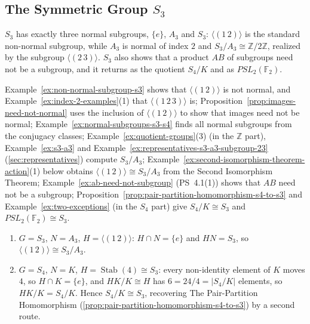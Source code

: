 \documentclass[11pt]{report}
\begin{document}
\subsection{\texorpdfstring{The Symmetric Group $S_3$}{The Symmetric Group S₃}}\label{sec:rev-ch8-s3}

$S_3$ has exactly three normal subgroups, $\{e\}$, $A_3$ and $S_3$: $\langle (1\,2) \rangle$ is the standard non-normal subgroup, while $A_3$ is normal of index $2$ and $S_3/A_3 \cong \mathbb{Z}/2\mathbb{Z}$, realized by the subgroup $\langle (2\,3) \rangle$. $S_3$ also shows that a product $AB$ of subgroups need not be a subgroup, and it returns as the quotient $S_4/K$ and as $PSL_2(\mathbb{F}_2)$.

Example~\ref{ex:non-normal-subgroup-s3} shows that $\langle (1\,2) \rangle$ is not normal, and Example~\ref{ex:index-2-examples}(1) that $\langle (1\,2\,3) \rangle$ is; Proposition~\ref{prop:images-need-not-normal} uses the inclusion of $\langle (1\,2) \rangle$ to show that images need not be normal; Example~\ref{ex:normal-subgroups-s3-s4} finds all normal subgroups from the conjugacy classes; Example~\ref{ex:quotient-groups}(3) (in the $\mathbb{Z}$ part), Example~\ref{ex:s3-a3} and Example~\ref{ex:representatives-s3-a3-subgroup-23} (\ref{sec:representatives}) compute $S_3/A_3$; Example~\ref{ex:second-isomorphism-theorem-action}(1) below obtains $\langle (1\,2) \rangle \cong S_3/A_3$ from the Second Isomorphism Theorem; Example~\ref{ex:ab-need-not-subgroup} (PS~4.1(1)) shows that $AB$ need not be a subgroup; Proposition~\ref{prop:pair-partition-homomorphism-s4-to-s3} and Example~\ref{ex:two-exceptions} (in the $S_4$ part) give $S_4/K \cong S_3$ and $PSL_2(\mathbb{F}_2) \cong S_3$.

\begin{exbox}\label{ex:second-isomorphism-theorem-action}
\begin{enumerate}[nosep]
    \item $G = S_3$, $N = A_3$, $H = \langle (1\,2) \rangle$: $H \cap N = \{e\}$ and $HN = S_3$, so $\langle (1\,2) \rangle \cong S_3/A_3$.
    \item $G = S_4$, $N = K$, $H = \operatorname{Stab}(4) \cong S_3$: every non-identity element of $K$ moves $4$, so $H \cap K = \{e\}$, and $HK/K \cong H$ has $6 = 24/4 = |S_4/K|$ elements, so $HK/K = S_4/K$. Hence $S_4/K \cong S_3$, recovering The Pair-Partition Homomorphism (\ref{prop:pair-partition-homomorphism-s4-to-s3}) by a second route.
\end{enumerate}
\end{exbox}
\end{document}
